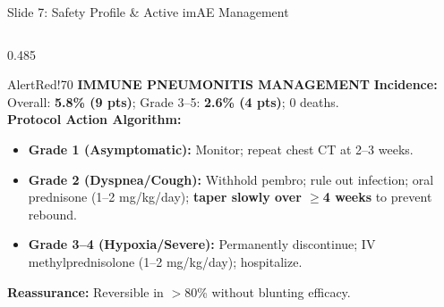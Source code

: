 \documentclass[aspectratio=169,10pt]{beamer}
\begin{document}
\begin{frame}{Slide 7: Safety Profile \& Active imAE Management}
\begin{columns}[T]
  \begin{column}{0.485\textwidth}
    \begin{statcard}{AlertRed!70}
      {\scriptsize\textbf{\color{AlertRed}IMMUNE PNEUMONITIS MANAGEMENT}}
      \vskip 2pt
      \tiny
      \textbf{Incidence:} Overall: \textbf{5.8\% (9 pts)}; Grade 3--5: \textbf{2.6\% (4 pts)}; 0 deaths.\\[2pt]
      \textbf{Protocol Action Algorithm:}
      \begin{itemize}\tiny\setlength{\itemsep}{1pt}
        \item \textbf{Grade 1 (Asymptomatic):} Monitor; repeat chest CT at 2--3 weeks.
        \item \textbf{Grade 2 (Dyspnea/Cough):} Withhold pembro; rule out infection; oral prednisone (1--2 mg/kg/day); \textbf{taper slowly over $\ge$4 weeks} to prevent rebound.
        \item \textbf{Grade 3--4 (Hypoxia/Severe):} Permanently discontinue; IV methylprednisolone (1--2 mg/kg/day); hospitalize.
      \end{itemize}
      \vskip 1pt
      \textbf{Reassurance:} Reversible in $>$80\% without blunting efficacy.
    \end{statcard}
  \end{column}
\end{columns}
\end{frame}
\end{document}
